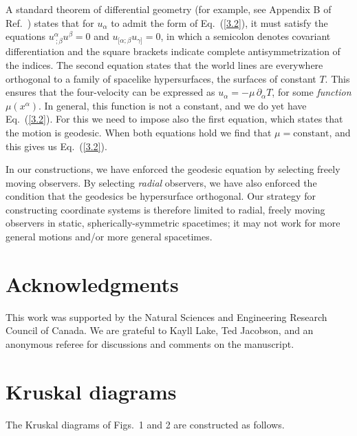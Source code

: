 A standard theorem of differential geometry (for example, see Appendix
B of Ref.~\cite{Wald}) states that for $u_\alpha$ to admit the form of
Eq.~(\ref{3.2}), it must satisfy the equations $u^\alpha_{\ ;\beta}
u^\beta = 0$ and $u_{[\alpha;\beta} u_{\gamma]} = 0$, in which a
semicolon denotes covariant differentiation and the square brackets
indicate complete antisymmetrization of the indices. The second
equation states that the world lines are everywhere orthogonal to a
family of spacelike hypersurfaces, the surfaces of constant $T$. This
ensures that the four-velocity can be expressed as $u_\alpha = -\mu\, 
\partial_\alpha T$, for some {\it function}  $\mu(x^\alpha)$. In
general, this function is not a constant, and we do yet have
Eq.~(\ref{3.2}). For this we need to impose also the first equation,
which states that the motion is geodesic. When both equations hold we
find that $\mu = \mbox{constant}$, and this gives us Eq.~(\ref{3.2}).   

In our constructions, we have enforced the geodesic equation by
selecting freely moving observers. By selecting {\it radial}
observers, we have also enforced the condition that the geodesics be
hypersurface orthogonal. Our strategy for constructing coordinate
systems is therefore limited to radial, freely moving observers in
static, spherically-symmetric spacetimes; it may not work for more
general motions and/or more general spacetimes.  

\section*{Acknowledgments}

This work was supported by the Natural Sciences and Engineering
Research Council of Canada. We are grateful to Kayll Lake, Ted
Jacobson, and an anonymous referee for discussions and comments on the
manuscript.  

\appendix
\section{Kruskal diagrams} 

The Kruskal diagrams of Figs.~1 and 2 are constructed as follows. 

